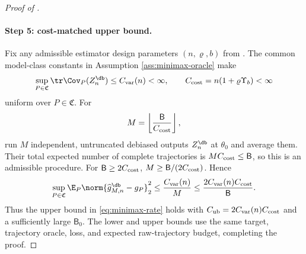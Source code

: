 \begin{proof}[Proof of ]
\paragraph{Step 5: cost-matched upper bound.}
Fix any admissible estimator design parameters $(n,\varrho,b)$ from .  The common model-class constants in Assumption \ref{ass:minimax-oracle} make
\[
 \sup_{P\in\mathfrak C}\tr\Cov_P(Z_n^{\db})\le C_{\rm var}(n)<\infty,
 \qquad
 C_{\rm cost}=n(1+\varrho \Upsilon_b)<\infty
\]
uniform over $P\in\mathfrak C$.  For
\[
 M=\left\lfloor\frac{\mathsf B}{C_{\rm cost}}\right\rfloor,
\]
run $M$ independent, untruncated debiased outputs $Z_n^{\db}$ at $\theta_0$ and average them.  Their total expected number of complete trajectories is $MC_{\rm cost}\le \mathsf B$, so this is an admissible procedure.  For $\mathsf B\ge2C_{\rm cost}$,
$M\ge \mathsf B/(2C_{\rm cost})$.  Hence
\[
 \sup_{P\in\mathfrak C}
 \E_P\norm{\widehat g_{M,n}^{\db}-g_P}_2^2
 \le\frac{C_{\rm var}(n)}{M}
 \le\frac{2C_{\rm var}(n)C_{\rm cost}}{\mathsf B}.
\]
Thus the upper bound in \eqref{eq:minimax-rate} holds with
$C_{\rm ub}=2C_{\rm var}(n)C_{\rm cost}$ and a sufficiently large $\mathsf B_0$.  The lower and upper bounds use the same target, trajectory oracle, loss, and expected raw-trajectory budget, completing the proof.
\end{proof}
